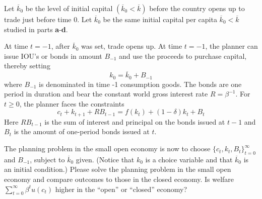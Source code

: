 \documentclass{article}
\begin{document}
\noindent
Let $\overline{k}_0$ be the level of initial capital 
$(\overline{k}_0<\overline{k})$ before the country opens up to trade just before time 0.  Let $\overline{k}_0$ be the same initial capital per capita $\overline{k}_0 < \overline{k}$ studied in parts {\bf a}-{\bf d}.

\medskip

 \noindent
At time $t=-1$, after $\overline{k}_0$ was set, trade opens up. 
At time $t=-1$, the planner can issue IOU's or bonds in amount $B_{-1}$ and use the proceeds to purchase capital, thereby setting
$$k_0=\overline{k}_0+B_{-1} $$
where $B_{-1}$ is denominated in time -1 consumption goods. The bonds are one period in duration and bear the constant world gross interest rate $R=\beta^{-1}$.
For $t\geq 0$, the planner faces the constraints
$$ c_t+k_{t+1}+RB_{t-1}=f(k_t)+(1-\delta)k_t+B_t$$
Here $RB_{t-1}$ is the sum of interest and  principal on the bonds issued at $t-1$ and $B_t$ is the amount of one-period bonds issued at $t$. 

\medskip 

\noindent
The planning problem in the small open economy is now to choose $\{c_t,k_{t},B_t\}_{t=0}^\infty$ and $B_{-1}$, subject to $\overline{k}_0$ given. (Notice that $k_0$ is a choice variable and that $\overline{k}_0$ is an initial condition.)
Please solve the  planning problem in the small open economy and compare outcomes to those in the closed economy.
 Is  welfare $\sum_{t=0}^\infty \beta^t u(c_t)$ higher in the ``open'' or ``closed'' economy?
\end{document}
